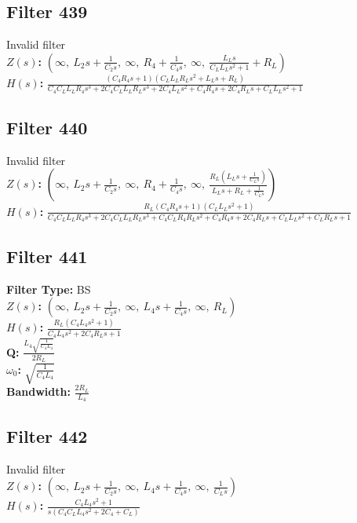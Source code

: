 \documentclass{article}
\begin{document}
\subsection*{Filter 439}
Invalid filter \\ 
\textbf{$Z(s)$:} $\left( \infty, \  L_{2} s + \frac{1}{C_{2} s}, \  \infty, \  R_{4} + \frac{1}{C_{4} s}, \  \infty, \  \frac{L_{L} s}{C_{L} L_{L} s^{2} + 1} + R_{L}\right)$ \\ 
\textbf{$H(s)$:} $\frac{\left(C_{4} R_{4} s + 1\right) \left(C_{L} L_{L} R_{L} s^{2} + L_{L} s + R_{L}\right)}{C_{4} C_{L} L_{L} R_{4} s^{3} + 2 C_{4} C_{L} L_{L} R_{L} s^{3} + 2 C_{4} L_{L} s^{2} + C_{4} R_{4} s + 2 C_{4} R_{L} s + C_{L} L_{L} s^{2} + 1}$ \\ 
\subsection*{Filter 440}
Invalid filter \\ 
\textbf{$Z(s)$:} $\left( \infty, \  L_{2} s + \frac{1}{C_{2} s}, \  \infty, \  R_{4} + \frac{1}{C_{4} s}, \  \infty, \  \frac{R_{L} \left(L_{L} s + \frac{1}{C_{L} s}\right)}{L_{L} s + R_{L} + \frac{1}{C_{L} s}}\right)$ \\ 
\textbf{$H(s)$:} $\frac{R_{L} \left(C_{4} R_{4} s + 1\right) \left(C_{L} L_{L} s^{2} + 1\right)}{C_{4} C_{L} L_{L} R_{4} s^{3} + 2 C_{4} C_{L} L_{L} R_{L} s^{3} + C_{4} C_{L} R_{4} R_{L} s^{2} + C_{4} R_{4} s + 2 C_{4} R_{L} s + C_{L} L_{L} s^{2} + C_{L} R_{L} s + 1}$ \\ 
\subsection*{Filter 441}
\textbf{Filter Type:} BS \\ 
\textbf{$Z(s)$:} $\left( \infty, \  L_{2} s + \frac{1}{C_{2} s}, \  \infty, \  L_{4} s + \frac{1}{C_{4} s}, \  \infty, \  R_{L}\right)$ \\ 
\textbf{$H(s)$:} $\frac{R_{L} \left(C_{4} L_{4} s^{2} + 1\right)}{C_{4} L_{4} s^{2} + 2 C_{4} R_{L} s + 1}$ \\ 
\textbf{Q:} $\frac{L_{4} \sqrt{\frac{1}{C_{4} L_{4}}}}{2 R_{L}}$ \\ 
\textbf{$\omega_0$:} $\sqrt{\frac{1}{C_{4} L_{4}}}$ \\ 
\textbf{Bandwidth:} $\frac{2 R_{L}}{L_{4}}$ \\ 
\subsection*{Filter 442}
Invalid filter \\ 
\textbf{$Z(s)$:} $\left( \infty, \  L_{2} s + \frac{1}{C_{2} s}, \  \infty, \  L_{4} s + \frac{1}{C_{4} s}, \  \infty, \  \frac{1}{C_{L} s}\right)$ \\ 
\textbf{$H(s)$:} $\frac{C_{4} L_{4} s^{2} + 1}{s \left(C_{4} C_{L} L_{4} s^{2} + 2 C_{4} + C_{L}\right)}$ \\ 
\end{document}
